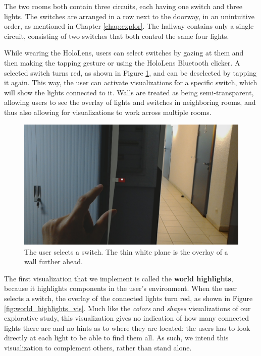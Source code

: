 The two rooms both contain three circuits, each having one switch and three lights. The switches are arranged in a row next to the doorway, in an unintuitive order, as mentioned in Chapter \ref{chap:explor}. The hallway contains only a single circuit, consisting of two switches that both control the same four lights.

While wearing the HoloLens, users can select switches by gazing at them and then making the tapping gesture or using the HoloLens Bluetooth clicker. A selected switch turns red, as shown in Figure \ref{fig:selection}, and can be deselected by tapping it again. This way, the user can activate visualizations for a specific switch, which will show the lights connected to it. Walls are treated as being semi-transparent, allowing users to see the overlay of lights and switches in neighboring rooms, and thus also allowing for visualizations to work across multiple rooms.

\begin{figure}
    \centering
    \includegraphics[width=1.0\linewidth]{resources/implementation/selection.jpg}
    \caption{The user selects a switch. The thin white plane is the overlay of a wall further ahead.}
    \label{fig:selection}
\end{figure}

The first visualization that we implement is called the \textbf{world highlights}, because it highlights components in the user's environment. When the user selects a switch, the overlay of the connected lights turn red, as shown in Figure \ref{fig:world_highlights_vis}. Much like the \textit{colors} and \textit{shapes} visualizations of our explorative study, this visualization gives no indication of how many connected lights there are and no hints as to where they are located; the users has to look directly at each light to be able to find them all. As such, we intend this visualization to complement others, rather than stand alone.

